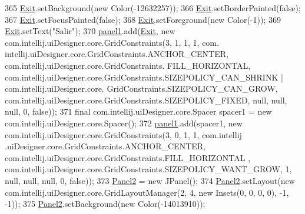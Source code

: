 \begin{DoxyCode}
365         \hyperlink{classpresentacion_1_1form_1_1mainForm_a721fa95a4d72e8f68875fcc0003e041f}{Exit}.setBackground(\textcolor{keyword}{new} Color(-12632257));
366         \hyperlink{classpresentacion_1_1form_1_1mainForm_a721fa95a4d72e8f68875fcc0003e041f}{Exit}.setBorderPainted(\textcolor{keyword}{false});
367         \hyperlink{classpresentacion_1_1form_1_1mainForm_a721fa95a4d72e8f68875fcc0003e041f}{Exit}.setFocusPainted(\textcolor{keyword}{false});
368         \hyperlink{classpresentacion_1_1form_1_1mainForm_a721fa95a4d72e8f68875fcc0003e041f}{Exit}.setForeground(\textcolor{keyword}{new} Color(-1));
369         \hyperlink{classpresentacion_1_1form_1_1mainForm_a721fa95a4d72e8f68875fcc0003e041f}{Exit}.setText(\textcolor{stringliteral}{"Salir"});
370         \hyperlink{classpresentacion_1_1form_1_1mainForm_aa43e009cc6dc09d4e637385fbd361510}{panel1}.add(\hyperlink{classpresentacion_1_1form_1_1mainForm_a721fa95a4d72e8f68875fcc0003e041f}{Exit}, \textcolor{keyword}{new} com.intellij.uiDesigner.core.GridConstraints(3, 1, 1, 1, com.
      intellij.uiDesigner.core.GridConstraints.ANCHOR\_CENTER, com.intellij.uiDesigner.core.GridConstraints.
      FILL\_HORIZONTAL, com.intellij.uiDesigner.core.GridConstraints.SIZEPOLICY\_CAN\_SHRINK | com.intellij.uiDesigner.core.
      GridConstraints.SIZEPOLICY\_CAN\_GROW, com.intellij.uiDesigner.core.GridConstraints.SIZEPOLICY\_FIXED, null, null, 
      null, 0, \textcolor{keyword}{false}));
371         \textcolor{keyword}{final} com.intellij.uiDesigner.core.Spacer spacer1 = \textcolor{keyword}{new} com.intellij.uiDesigner.core.Spacer();
372         \hyperlink{classpresentacion_1_1form_1_1mainForm_aa43e009cc6dc09d4e637385fbd361510}{panel1}.add(spacer1, \textcolor{keyword}{new} com.intellij.uiDesigner.core.GridConstraints(3, 0, 1, 1, com.intellij
      .uiDesigner.core.GridConstraints.ANCHOR\_CENTER, com.intellij.uiDesigner.core.GridConstraints.FILL\_HORIZONTAL
      , com.intellij.uiDesigner.core.GridConstraints.SIZEPOLICY\_WANT\_GROW, 1, null, null, null, 0, \textcolor{keyword}{false}));
373         \hyperlink{classpresentacion_1_1form_1_1mainForm_a40e87b5e341114287b070012a4aadc8f}{Panel2} = \textcolor{keyword}{new} JPanel();
374         \hyperlink{classpresentacion_1_1form_1_1mainForm_a40e87b5e341114287b070012a4aadc8f}{Panel2}.setLayout(\textcolor{keyword}{new} com.intellij.uiDesigner.core.GridLayoutManager(2, 4, \textcolor{keyword}{new} Insets(0, 0, 0,
       0), -1, -1));
375         \hyperlink{classpresentacion_1_1form_1_1mainForm_a40e87b5e341114287b070012a4aadc8f}{Panel2}.setBackground(\textcolor{keyword}{new} Color(-14013910));

\end{DoxyCode}
